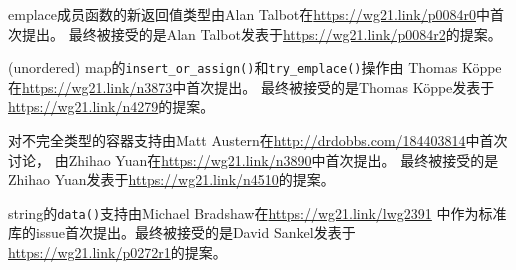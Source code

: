 emplace成员函数的新返回值类型由Alan Talbot在\url{https://wg21.link/p0084r0}中首次提出。
最终被接受的是Alan Talbot发表于\url{https://wg21.link/p0084r2}的提案。

(unordered) map的\texttt{insert\_or\_assign()}和\texttt{try\_emplace()}操作由
Thomas Köppe在\url{https://wg21.link/n3873}中首次提出。
最终被接受的是Thomas Köppe发表于\url{https://wg21.link/n4279}的提案。

对不完全类型的容器支持由Matt Austern在\url{http://drdobbs.com/184403814}中首次讨论，
由Zhihao Yuan在\url{https://wg21.link/n3890}中首次提出。
最终被接受的是Zhihao Yuan发表于\url{https://wg21.link/n4510}的提案。

string的\texttt{data()}支持由Michael Bradshaw在\url{https://wg21.link/lwg2391}
中作为标准库的issue首次提出。最终被接受的是David Sankel发表于\url{https://wg21.link/p0272r1}的提案。
